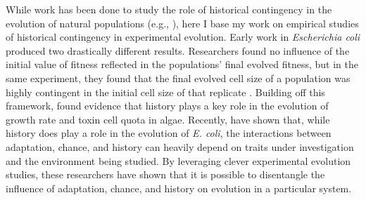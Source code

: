 While work has been done to study the role of historical contingency in the evolution of natural populations (e.g., \citep{lososContingencyDeterminismReplicated1998, kellerHistoryChanceAdaptation2008}), here I base my work on empirical studies of historical contingency in experimental evolution.
Early work in \textit{Escherichia coli} produced two drastically different results. 
Researchers found no influence of the initial value of fitness reflected in the populations' final evolved fitness, but in the same experiment, they found that the final evolved cell size of a population was highly contingent in the initial cell size of that replicate \citep{travisanoExperimentalTestsRoles1995}. %
Building off this framework, \citet{flores-moyaEffectsAdaptationChance2012} found evidence that history plays a key role in the evolution of growth rate and toxin cell quota in algae. 
Recently, \citet{smithFitnessEvolvingBacterial2022} have shown that, while history does play a role in the evolution of \textit{E. coli}, the interactions between adaptation, chance, and history can heavily depend on traits under investigation and the environment being studied. 
By leveraging clever experimental evolution studies, these researchers have shown that it is possible to disentangle the influence of adaptation, chance, and history on evolution in a particular system. 


